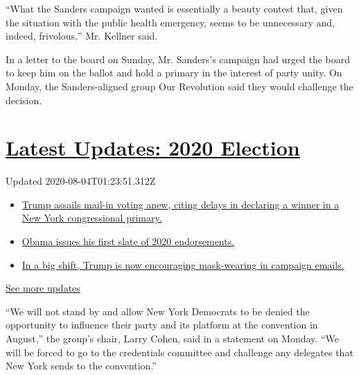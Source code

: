 ``What the Sanders campaign wanted is essentially a beauty contest that,
given the situation with the public health emergency, seems to be
unnecessary and, indeed, frivolous,'' Mr. Kellner said.

In a letter to the board on Sunday, Mr. Sanders's campaign had urged the
board to keep him on the ballot and hold a primary in the interest of
party unity. On Monday, the Sanders-aligned group Our Revolution said
they would challenge the decision.

\hypertarget{latest-updates-2020-election}{%
\section{\texorpdfstring{\href{https://www.nytimes.com/2020/08/03/us/elections/biden-vs-trump.html?action=click\&pgtype=Article\&state=default\&region=MAIN_CONTENT_1\&context=storylines_live_updates}{Latest
Updates: 2020
Election}}{Latest Updates: 2020 Election}}\label{latest-updates-2020-election}}

Updated 2020-08-04T01:23:51.312Z

\begin{itemize}
\tightlist
\item
  \href{https://www.nytimes.com/2020/08/03/us/elections/biden-vs-trump.html?action=click\&pgtype=Article\&state=default\&region=MAIN_CONTENT_1\&context=storylines_live_updates\#link-6494b448}{Trump
  assails mail-in voting anew, citing delays in declaring a winner in a
  New York congressional primary.}
\item
  \href{https://www.nytimes.com/2020/08/03/us/elections/biden-vs-trump.html?action=click\&pgtype=Article\&state=default\&region=MAIN_CONTENT_1\&context=storylines_live_updates\#link-3de249e6}{Obama
  issues his first slate of 2020 endorsements.}
\item
  \href{https://www.nytimes.com/2020/08/03/us/elections/biden-vs-trump.html?action=click\&pgtype=Article\&state=default\&region=MAIN_CONTENT_1\&context=storylines_live_updates\#link-54e34d20}{In
  a big shift, Trump is now encouraging mask-wearing in campaign
  emails.}
\end{itemize}

\href{https://www.nytimes.com/2020/08/03/us/elections/biden-vs-trump.html?action=click\&pgtype=Article\&state=default\&region=MAIN_CONTENT_1\&context=storylines_live_updates}{See
more updates}

``We will not stand by and allow New York Democrats to be denied the
opportunity to influence their party and its platform at the convention
in August,'' the group's chair, Larry Cohen, said in a statement on
Monday. ``We will be forced to go to the credentials committee and
challenge any delegates that New York sends to the convention.''

